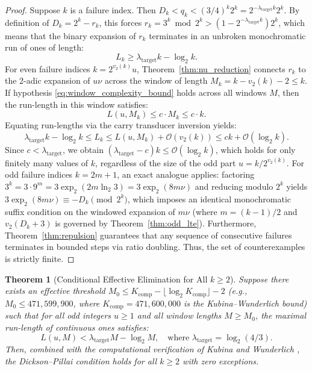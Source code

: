 \documentclass[11pt,reqno]{amsart}
\newtheorem{theorem}{Theorem}[section]
\theoremstyle{definition}
\numberwithin{equation}{section}
\begin{document}
\begin{proof}
Suppose $k$ is a failure index. Then $D_k < q_k < (3/4)^k 2^k = 2^{-\lambda_{\mathrm{target}} k} 2^k$.
By definition of $D_k = 2^k - r_k$, this forces $r_k = 3^k \bmod 2^k > (1 - 2^{-\lambda_{\mathrm{target}} k}) 2^k$, which means that the binary expansion of $r_k$ terminates in an unbroken monochromatic run of ones of length:
\[
L_k \ge \lambda_{\mathrm{target}} k - \log_2 k.
\]
For even failure indices $k = 2^{v_2(k)} u$, Theorem~\ref{thm:nu_reduction} connects $r_k$ to the 2-adic expansion of $u \nu$ across the window of length $M_k = k - v_2(k) - 2 \le k$.
If hypothesis \eqref{eq:window_complexity_bound} holds across all windows $M$, then the run-length in this window satisfies:
\[
L(u, M_k) \le c \cdot M_k \le c \cdot k.
\]
Equating run-lengths via the carry transducer inversion yields:
\[
\lambda_{\mathrm{target}} k - \log_2 k \le L_k \le L(u, M_k) + \mathcal{O}(v_2(k)) \le c k + \mathcal{O}(\log_2 k).
\]
Since $c < \lambda_{\mathrm{target}}$, we obtain $(\lambda_{\mathrm{target}} - c) k \le \mathcal{O}(\log_2 k)$, which holds for only finitely many values of $k$, regardless of the size of the odd part $u = k / 2^{v_2(k)}$.
For odd failure indices $k = 2m + 1$, an exact analogue applies: factoring $3^k = 3 \cdot 9^m = 3 \exp_2(2m \ln_2 3) = 3 \exp_2(8m \nu)$ and reducing modulo $2^k$ yields $3 \exp_2(8m \nu) \equiv -D_k \pmod{2^k}$, which imposes an identical monochromatic suffix condition on the windowed expansion of $m \nu$ (where $m = (k - 1)/2$ and $v_2(D_k + 3)$ is governed by Theorem~\ref{thm:odd_lte}). Furthermore, Theorem~\ref{thm:repulsion} guarantees that any sequence of consecutive failures terminates in bounded steps via ratio doubling. Thus, the set of counterexamples is strictly finite.
\end{proof}

\begin{theorem}[Conditional Effective Elimination for All $k \ge 2$]\label{thm:conditional_effective}
Suppose there exists an effective threshold $M_0 \le K_{\mathrm{comp}} - \lfloor \log_2 K_{\mathrm{comp}} \rfloor - 2$ (e.g., $M_0 \le 471{,}599{,}900$, where $K_{\mathrm{comp}} = 471{,}600{,}000$ is the Kubina--Wunderlich bound) such that for all odd integers $u \ge 1$ and all window lengths $M \ge M_0$, the maximal run-length of continuous ones satisfies:
\begin{equation}\label{eq:effective_hypothesis}
L(u, M) < \lambda_{\mathrm{target}} M - \log_2 M, \quad \text{where } \lambda_{\mathrm{target}} = \log_2(4/3).
\end{equation}
Then, combined with the computational verification of Kubina and Wunderlich \cite{kubina1990}, the Dickson--Pillai condition holds for all $k \ge 2$ with zero exceptions.
\end{theorem}
\end{document}
